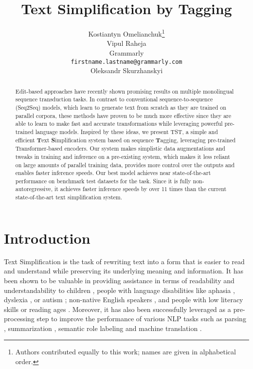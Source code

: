 \documentclass[11pt,a4paper]{article}
\title{Text Simplification by Tagging}
\author{Kostiantyn Omelianchuk\thanks{\hspace{4pt}Authors contributed equally to this work; names are given in alphabetical order.} \\ \And
  Vipul Raheja\footnotemark[1] \\
  Grammarly \\
  \texttt{firstname.lastname@grammarly.com} \\\And
  Oleksandr Skurzhanskyi\footnotemark[1]}
\date{}
\begin{document}
\maketitle
\begin{abstract}
Edit-based approaches have recently shown promising results on multiple monolingual sequence transduction tasks. In contrast to conventional sequence-to-sequence (Seq2Seq) models, which learn to generate text from scratch as they are trained on parallel corpora, these methods have proven to be much more effective since they are able to learn to make fast and accurate transformations while leveraging powerful pre-trained language models. Inspired by these ideas, we present TST, a simple and efficient \textbf{T}ext \textbf{S}implification system based on sequence \textbf{T}agging, leveraging pre-trained Transformer-based encoders. Our system makes simplistic data augmentations and tweaks in training and inference on a pre-existing system, which makes it less reliant on large amounts of parallel training data, provides more control over the outputs and enables faster inference speeds. Our best model achieves near state-of-the-art performance on benchmark test datasets for the task. Since it is fully non-autoregressive, it achieves faster inference speeds by over 11 times than the current state-of-the-art text simplification system. 
\end{abstract}

\section{Introduction}
Text Simplification is the task of rewriting text into a form that is easier to read and understand while preserving its underlying meaning and information. It has been shown to be valuable in providing assistance in terms of readability and understandability to children \cite{Belder2010TextSF, kajiwara-etal-2013-selecting}, people with language disabilities like aphasia \cite{carroll1998practical, carroll-etal-1999-simplifying, 10.1145/1168987.1169027}, dyslexia \cite{10.1145/2461121.2461126, 10.1007/978-3-642-37256-8_41}, or autism \cite{evans-etal-2014-evaluation}; non-native English speakers \cite{Petersen07textsimplification, paetzold-2015-reliable, paetzold-specia-2016-understanding, 10.5555/3016387.3016433, pellow-eskenazi-2014-open}, and people with low literacy skills or reading ages \cite{10.1007/11671299_59, 10.1145/1456536.1456540, Gasperin2009NaturalLP, 10.1145/1621995.1622002}.
Moreover, it has also been successfully leveraged as a pre-processing step to improve the performance of various NLP tasks such as parsing \cite{chandrasekar-etal-1996-motivations}, summarization \cite{10.1007/978-3-540-30468-5_47, Silveira12enhancingmulti-document}, semantic role labeling \cite{vickrey-koller-2008-sentence, 10.5555/3171837.3172021} and machine translation \cite{10.1007/3-540-49478-2_40, stajner-popovic-2016-text, HASLER2017221}.
\end{document}
